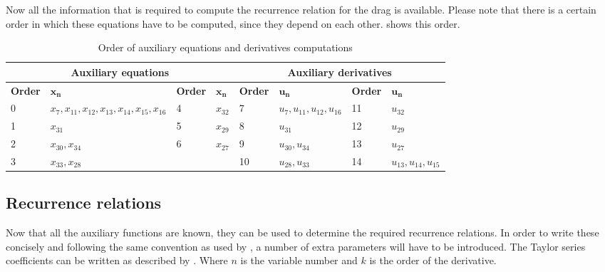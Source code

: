 Now all the information that is required to compute the recurrence relation for the drag is available. Please note that there is a certain order in which these equations have to be computed, since they depend on each other.  shows this order.


\begin{table}[!ht]
\begin{center}
\caption{Order of auxiliary equations and derivatives computations}
\label{tab:calcOrderAuxEq}
\begin{tabular}{|l|l||l|l||l|l||l|l|}
\hline 
\multicolumn{4}{c}{\textbf{Auxiliary equations}} & \multicolumn{4}{c}{\textbf{Auxiliary derivatives}} \\ \hline \hline
\textbf{Order} & $\mathbf{x_{n}}$ &\textbf{Order} & $\mathbf{x_{n}}$ & \textbf{Order} & $\mathbf{u_{n}}$ & \textbf{Order} & $\mathbf{u_{n}}$ \\ \hline 
0 & $ x_{7} ,x_{11}, x_{12}, x_{13}, x_{14}, x_{15}, x_{16} $ & 4 & $ x_{32}$ & 7 & $ u_{7}, u_{11}, u_{12}, u_{16} $ & 11 & $ u_{32} $  \\ \hline
1 & $ x_{31} $ & 5 & $ x_{29} $  & 8 & $u_{31}$ &  12 &  $ u_{29} $ \\ \hline
2 & $ x_{30}, x_{34}$ & 6 & $ x_{27} $  & 9 & $ u_{30}, u_{34} $ &  13 & $ u_{27} $ \\ \hline
3 & $ x_{33}, x_{28} $ &   &  & 10 & $ u_{28}, u_{33} $ &  14 &  $ u_{13}, u_{14}, u_{15} $\\ \hline


\end{tabular}
\end{center}
\end{table}





%
%



\subsection{Recurrence relations}
\label{subsec:recRel}
Now that all the auxiliary functions are known, they can be used to determine the required recurrence relations. In order to write these concisely and following the same convention as used by \cite{scott2008high}, a number of extra parameters will have to be introduced. The Taylor series coefficients can be written as described by . Where $n$ is the variable number and $k$ is the order of the derivative.

